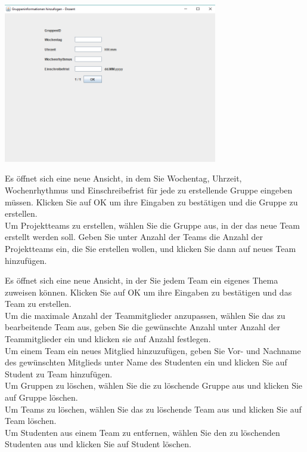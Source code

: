 \documentclass{Handbuch}
\begin{document}
\begin{center}
	\includegraphics[width=0.7\textwidth]{img_DozentenGUI_13.png}
\end{center}Es öffnet sich eine neue Ansicht, in dem Sie Wochentag, Uhrzeit, Wochenrhythmus und Einschreibefrist für jede zu erstellende Gruppe eingeben müssen. Klicken Sie auf \frqq OK\flqq{} um ihre Eingaben zu bestätigen und die Gruppe zu erstellen. \\
Um Projektteams zu erstellen, wählen Sie die Gruppe aus, in der das neue Team erstellt werden soll. Geben Sie unter \glqq Anzahl der Teams\grqq{} die Anzahl der Projektteams ein, die Sie erstellen wollen, und klicken Sie dann auf \frqq neues Team hinzufügen\flqq. 
\begin{center}
\end{center}Es öffnet sich eine neue Ansicht, in der Sie jedem Team ein eigenes Thema zuweisen können. Klicken Sie auf \frqq OK\flqq{} um ihre Eingaben zu bestätigen und das Team zu erstellen. \\
Um die maximale Anzahl der Teammitglieder anzupassen, wählen Sie das zu bearbeitende Team aus, geben Sie die gewünschte Anzahl unter  \glqq Anzahl der Teammitglieder\grqq{} ein und klicken sie auf \frqq Anzahl festlegen\flqq.\\
Um einem Team ein neues Mitglied hinzuzufügen, geben Sie Vor- und Nachname des gewünschten Mitglieds unter \glqq Name des Studenten\grqq{} ein und klicken Sie auf \frqq Student zu Team hinzufügen\flqq.\\
Um Gruppen zu löschen, wählen Sie die zu löschende Gruppe aus und klicken Sie auf \frqq Gruppe löschen\flqq.\\
Um Teams zu löschen, wählen Sie das zu löschende Team aus und klicken Sie auf \frqq Team löschen\flqq.\\
Um Studenten aus einem Team zu entfernen, wählen Sie den zu löschenden Studenten aus und klicken Sie auf \frqq Student löschen\flqq.\\
\end{document}
